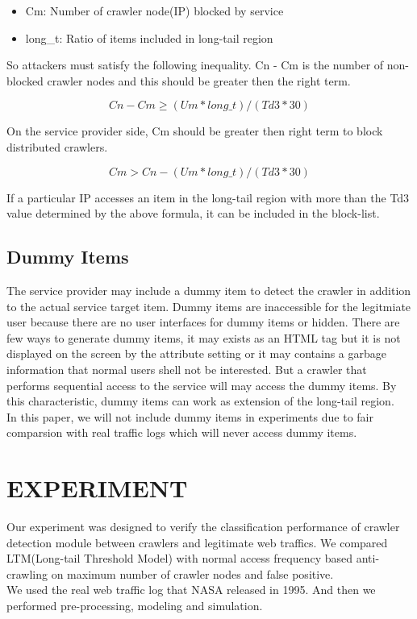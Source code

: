 \documentclass[sigconf,anonymous=true]{acmart}
\begin{document}
\begin{itemize}
\item Cm: Number of crawler node(IP) blocked by service
\item long\_t: Ratio of items included in long-tail region
\end{itemize}

So attackers must satisfy the following inequality. Cn - Cm is the number of non-blocked crawler nodes and this should be greater then the right term.

  \begin{displaymath}
Cn - Cm \geq (Um * long\_t) / (Td3 * 30)
  \end{displaymath}\newline

On the service provider side, Cm should be greater then right term to block distributed crawlers.

  \begin{displaymath}
Cm > Cn - (Um * long\_t) / (Td3 * 30)
  \end{displaymath}\newline

If a particular IP accesses an item in the long-tail region with more than the Td3 value determined by the above formula, it can be included in the block-list.


\subsection{Dummy Items}
The service provider may include a dummy item to detect the crawler in addition to the actual service target item. Dummy items are inaccessible for the legitmiate user because there are no user interfaces for dummy items or hidden. There are few ways to generate dummy items, it may exists as an HTML tag but it is not displayed on the screen by the attribute setting or it may contains a garbage information that normal users shell not be interested. But a crawler that performs sequential access to the service will may access the dummy items. By this characteristic, dummy items can work as extension of the long-tail region.\\
In this paper, we will not include dummy items in experiments due to fair comparsion with real traffic logs which will never access dummy items.\\



%
%
\section{EXPERIMENT}
Our experiment was designed to verify the classification performance of crawler detection module between crawlers and legitimate  web traffics. We compared LTM(Long-tail Threshold Model) with normal access frequency based anti-crawling on maximum number of crawler nodes and false positive.\\
We used the real web traffic log that NASA released in 1995. And then we performed pre-processing, modeling and simulation.
\end{document}
